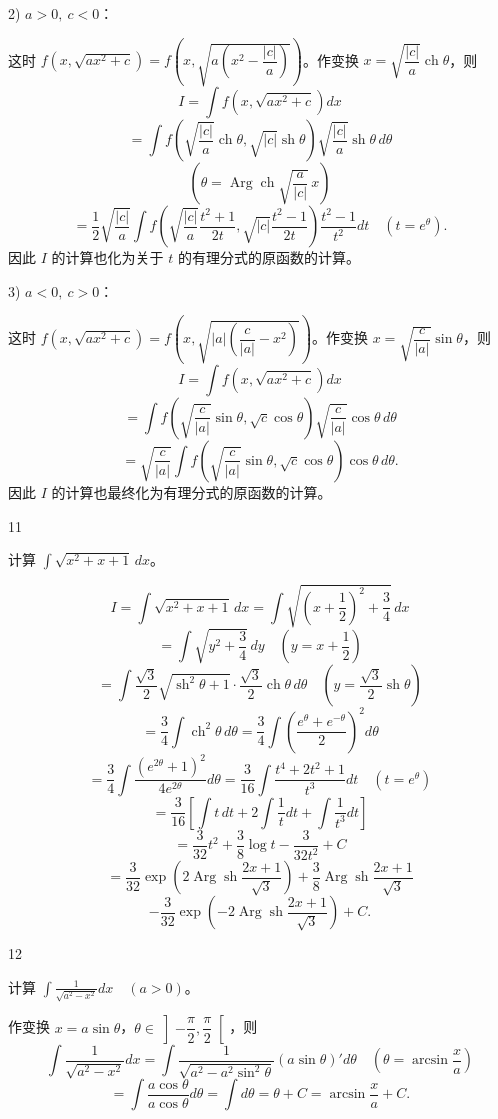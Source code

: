 2) \(a>0,\ c<0\)：

这时 \(f(x,\sqrt{ax^2+c})=f\left(x,\sqrt{a\left(x^2-\dfrac{|c|}{a}\right)}\right)\)。作变换 \(x=\sqrt{\dfrac{|c|}{a}}\operatorname{ch}\theta\)，则
\[
I=\int f(x,\sqrt{ax^2+c})dx
\]
\[
=\int f\left(\sqrt{\frac{|c|}{a}}\operatorname{ch}\theta,\sqrt{|c|}\operatorname{sh}\theta\right)\sqrt{\frac{|c|}{a}}\operatorname{sh}\theta\,d\theta
\]
\[
\left(\theta=\operatorname{Arg}\operatorname{ch}\sqrt{\frac a{|c|}}\,x\right)
\]
\[
=\frac12\sqrt{\frac{|c|}{a}}\int f\left(\sqrt{\frac{|c|}{a}}\frac{t^2+1}{2t},\sqrt{|c|}\frac{t^2-1}{2t}\right)\frac{t^2-1}{t^2}dt\quad(t=e^\theta).
\]
因此 \(I\) 的计算也化为关于 \(t\) 的有理分式的原函数的计算。

3) \(a<0,\ c>0\)：

这时 \(f(x,\sqrt{ax^2+c})=f\left(x,\sqrt{|a|\left(\dfrac c{|a|}-x^2\right)}\right)\)。作变换 \(x=\sqrt{\dfrac c{|a|}}\sin\theta\)，则
\[
I=\int f(x,\sqrt{ax^2+c})dx
\]
\[
=\int f\left(\sqrt{\frac c{|a|}}\sin\theta,\sqrt c\cos\theta\right)\sqrt{\frac c{|a|}}\cos\theta\,d\theta
\]
\[
=\sqrt{\frac c{|a|}}\int f\left(\sqrt{\frac c{|a|}}\sin\theta,\sqrt c\cos\theta\right)\cos\theta\,d\theta.
\]
因此 \(I\) 的计算也最终化为有理分式的原函数的计算。

\begin{sourceexample}{11}

	计算 \(\displaystyle\int\sqrt{x^2+x+1}\,dx\)。

	\[
	I=\int\sqrt{x^2+x+1}\,dx=\int\sqrt{\left(x+\frac12\right)^2+\frac34}\,dx
	\]
	\[
	=\int\sqrt{y^2+\frac34}\,dy\quad\left(y=x+\frac12\right)
	\]
	\[
	=\int\frac{\sqrt3}{2}\sqrt{\operatorname{sh}^2\theta+1}\cdot\frac{\sqrt3}{2}\operatorname{ch}\theta\,d\theta\quad\left(y=\frac{\sqrt3}{2}\operatorname{sh}\theta\right)
	\]
	\[
	=\frac34\int\operatorname{ch}^2\theta\,d\theta=\frac34\int\left(\frac{e^\theta+e^{-\theta}}2\right)^2d\theta
	\]
	\[
	=\frac34\int\frac{(e^{2\theta}+1)^2}{4e^{2\theta}}d\theta=\frac3{16}\int\frac{t^4+2t^2+1}{t^3}dt\quad(t=e^\theta)
	\]
	\[
	=\frac3{16}\left[\int t\,dt+2\int\frac1t dt+\int\frac1{t^3}dt\right]
	\]
	\[
	=\frac3{32}t^2+\frac38\log t-\frac3{32t^2}+C
	\]
	\[
	=\frac3{32}\exp\left(2\operatorname{Arg}\operatorname{sh}\frac{2x+1}{\sqrt3}\right)+\frac38\operatorname{Arg}\operatorname{sh}\frac{2x+1}{\sqrt3}
	\]
	\[
	-\frac3{32}\exp\left(-2\operatorname{Arg}\operatorname{sh}\frac{2x+1}{\sqrt3}\right)+C.
	\]

\end{sourceexample}

\begin{sourceexample}{12}

	计算 \(\displaystyle\int\frac1{\sqrt{a^2-x^2}}dx\quad(a>0)\)。

	作变换 \(x=a\sin\theta\)，\(\theta\in\left]-\dfrac\pi2,\dfrac\pi2\right[\)，则
	\[
	\int\frac1{\sqrt{a^2-x^2}}dx=\int\frac1{\sqrt{a^2-a^2\sin^2\theta}}(a\sin\theta)'d\theta\quad\left(\theta=\arcsin\frac xa\right)
	\]
	\[
	=\int\frac{a\cos\theta}{a\cos\theta}d\theta=\int d\theta=\theta+C=\arcsin\frac xa+C.
	\]

\end{sourceexample}

